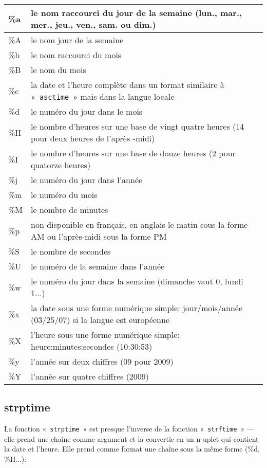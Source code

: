 \begin{center}
\begin{tabular}{|l|p{12cm}|}
\hline
\%a & le nom raccourci du jour de la semaine (lun., mar., mer., jeu., ven., sam. ou dim.) \\
\hline
\%A & le nom jour de la semaine  \\
\hline
\%b & le nom raccourci du mois \\
\hline
\%B & le nom du mois \\
\hline
\%c & la date et l'heure complète dans un format similaire à «~\texttt{asctime}~» mais dans la langue locale\\
\hline
\%d & le numéro du jour dans le mois\\
\hline
\%H & le nombre d'heures sur une base de vingt quatre heures (14 pour deux heures de l'après -midi) \\
\hline
\%I & le nombre d'heures sur une base de douze heures (2 pour quatorze heures)\\
\hline
\%j & le numéro du jour dans l'année\\
\hline
\%m & le numéro du mois \\
\hline
\%M & le nombre de minutes \\
\hline
\%p & non disponible en français, en anglais le matin sous la forme AM ou l'après-midi sous la forme PM \\
\hline
\%S & le nombre de secondes\\
\hline
\%U & le numéro de la semaine dans l'année \\
\hline
\%w & le numéro du jour dans la semaine (dimanche vaut 0, lundi 1...) \\
\hline
\%x & la date sous une forme numérique simple: jour/mois/année (03/25/07) si la langue est européenne  \\
\hline
\%X & l'heure sous une forme numérique simple: heure:minutes:secondes (10:30:53) \\
\hline
\%y & l'année sur deux chiffres (09 pour 2009) \\
\hline
\%Y & l'année sur quatre chiffres (2009) \\
\hline
\end{tabular}
\end{center}
\subsection{strptime}

La fonction «~\texttt{strptime}~» est presque l'inverse de la fonction «~\texttt{strftime}~» --- elle prend une chaîne comme argument et la convertie en un n-uplet qui contient la date et l'heure. Elle prend comme format une chaîne sous la même forme (\%d, \%H...):


